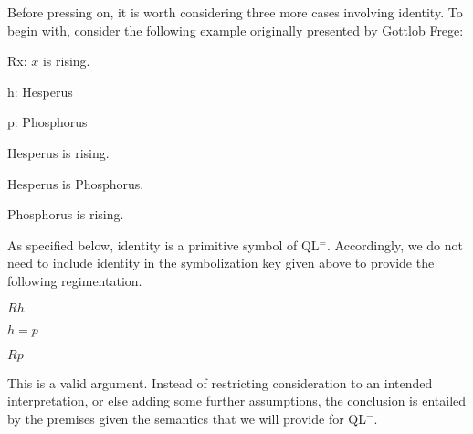 Before pressing on, it is worth considering three more cases involving identity.
To begin with, consider the following example originally presented by Gottlob Frege:

\begin{multicols}{2}

\begin{ekey}
    \item[Rx:] $x$ is rising.
    \item[h:] Hesperus
    \item[p:] Phosphorus
\end{ekey}

\begin{earg}
  \item[] Hesperus is rising.
  \item[] Hesperus is Phosphorus.
  \item[\therefore] Phosphorus is rising.
\end{earg}

\end{multicols}

As specified below, identity is a primitive symbol of QL$^=$.
Accordingly, we do not need to include identity in the symbolization key given above to provide the following regimentation.

\begin{earg}
  \item[] $Rh$
  \item[] $h=p$
  \item[\therefore] $Rp$
\end{earg}

This is a valid argument.
Instead of restricting consideration to an intended interpretation, or else adding some further assumptions, the conclusion is entailed by the premises given the semantics that we will provide for QL$^=$.


